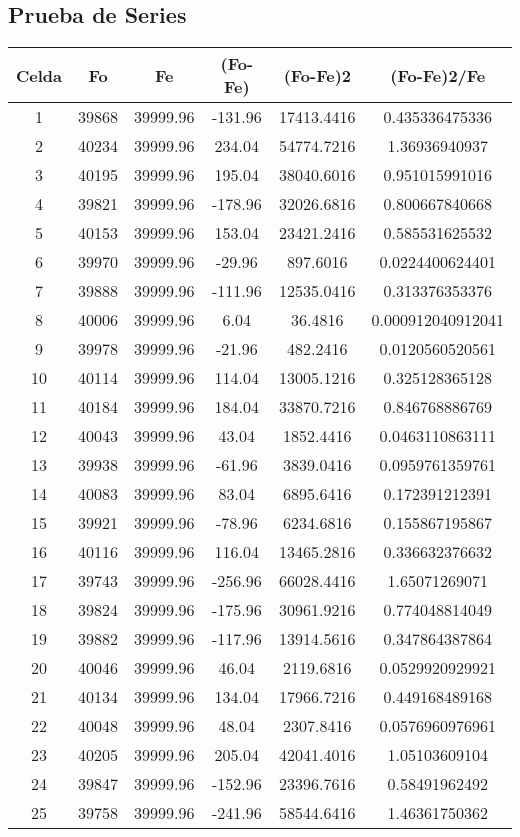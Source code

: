 \documentclass{article}
\begin{document}
\subsection{Prueba de Series}
\begin{tabular}{|c|c|c|c|c|c|}
Celda&Fo&Fe&(Fo{-}Fe)&(Fo{-}Fe)2&(Fo{-}Fe)2/Fe\\
\hline
1&39868&39999.96&{-}131.96&17413.4416&0.435336475336\\
\hline
2&40234&39999.96&234.04&54774.7216&1.36936940937\\
\hline
3&40195&39999.96&195.04&38040.6016&0.951015991016\\
\hline
4&39821&39999.96&{-}178.96&32026.6816&0.800667840668\\
\hline
5&40153&39999.96&153.04&23421.2416&0.585531625532\\
\hline
6&39970&39999.96&{-}29.96&897.6016&0.0224400624401\\
\hline
7&39888&39999.96&{-}111.96&12535.0416&0.313376353376\\
\hline
8&40006&39999.96&6.04&36.4816&0.000912040912041\\
\hline
9&39978&39999.96&{-}21.96&482.2416&0.0120560520561\\
\hline
10&40114&39999.96&114.04&13005.1216&0.325128365128\\
\hline
11&40184&39999.96&184.04&33870.7216&0.846768886769\\
\hline
12&40043&39999.96&43.04&1852.4416&0.0463110863111\\
\hline
13&39938&39999.96&{-}61.96&3839.0416&0.0959761359761\\
\hline
14&40083&39999.96&83.04&6895.6416&0.172391212391\\
\hline
15&39921&39999.96&{-}78.96&6234.6816&0.155867195867\\
\hline
16&40116&39999.96&116.04&13465.2816&0.336632376632\\
\hline
17&39743&39999.96&{-}256.96&66028.4416&1.65071269071\\
\hline
18&39824&39999.96&{-}175.96&30961.9216&0.774048814049\\
\hline
19&39882&39999.96&{-}117.96&13914.5616&0.347864387864\\
\hline
20&40046&39999.96&46.04&2119.6816&0.0529920929921\\
\hline
21&40134&39999.96&134.04&17966.7216&0.449168489168\\
\hline
22&40048&39999.96&48.04&2307.8416&0.0576960976961\\
\hline
23&40205&39999.96&205.04&42041.4016&1.05103609104\\
\hline
24&39847&39999.96&{-}152.96&23396.7616&0.58491962492\\
\hline
25&39758&39999.96&{-}241.96&58544.6416&1.46361750362\\
\end{tabular}
\end{document}
